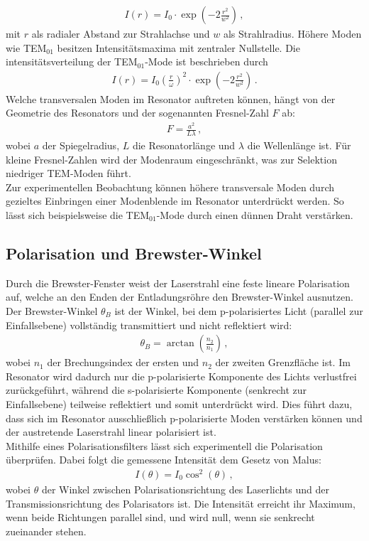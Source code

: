 \begin{align}
    I(r) = I_0 \cdot \exp\left(-2 \frac{r^2}{w^2} \right)\,, \label{eqn:intensitaet00}
\end{align}
mit $r$ als radialer Abstand zur Strahlachse und $w$ als Strahlradius. Höhere Moden wie TEM$_{01}$ besitzen Intensitätsmaxima mit zentraler Nullstelle. Die intensitätsverteilung der TEM$_{01}$-Mode ist beschrieben durch
\begin{align}
    I(r) = I_0 \left(\frac{r}{\omega}\right)^2\cdot \exp\left(-2 \frac{r^2}{w^2} \right)\,. \label{eqn:intensitaet10}
\end{align}
Welche transversalen Moden im Resonator auftreten können, hängt von der Geometrie des Resonators und der sogenannten Fresnel-Zahl $F$ ab:
\begin{align}
    F = \frac{a^2}{L \lambda}\,, \label{eqn:fresnel}
\end{align}
wobei $a$ der Spiegelradius, $L$ die Resonatorlänge und $\lambda$ die Wellenlänge ist. Für kleine Fresnel-Zahlen wird der Modenraum eingeschränkt, was zur Selektion niedriger TEM-Moden führt.\\
Zur experimentellen Beobachtung können höhere transversale Moden durch gezieltes Einbringen einer Modenblende im Resonator unterdrückt werden. So lässt sich beispielsweise die TEM$_{01}$-Mode durch einen dünnen Draht verstärken. \cite{laserspektroskopie} \cite{laser} \cite{anleitungV61}

\subsection{Polarisation und Brewster-Winkel}
Durch die Brewster-Fenster weist der Laserstrahl eine feste lineare Polarisation auf, welche an den Enden der Entladungsröhre den Brewster-Winkel ausnutzen. 
Der Brewster-Winkel $\theta_B$ ist der Winkel, bei dem p-polarisiertes Licht (parallel zur Einfallsebene) vollständig transmittiert und nicht reflektiert wird:
\begin{align}
    \theta_B = \arctan\left( \frac{n_2}{n_1} \right)\,, \label{eqn:Brewster}
\end{align}
wobei $n_1$ der Brechungsindex der ersten und $n_2$ der zweiten Grenzfläche ist. 
Im Resonator wird dadurch nur die p-polarisierte Komponente des Lichts verlustfrei zurückgeführt, während die s-polarisierte Komponente (senkrecht zur Einfallsebene) teilweise reflektiert und somit unterdrückt wird. 
Dies führt dazu, dass sich im Resonator ausschließlich p-polarisierte Moden verstärken können und der austretende Laserstrahl linear polarisiert ist.\\
Mithilfe eines Polarisationsfilters lässt sich experimentell die Polarisation überprüfen.
Dabei folgt die gemessene Intensität dem Gesetz von Malus:
\begin{align}
    I(\theta) = I_0 \cos^2(\theta)\,, \label{eqn:malus}
\end{align}
wobei $\theta$ der Winkel zwischen Polarisationsrichtung des Laserlichts und der Transmissionsrichtung des Polarisators ist. 
Die Intensität erreicht ihr Maximum, wenn beide Richtungen parallel sind, und wird null, wenn sie senkrecht zueinander stehen. \cite{laser}

